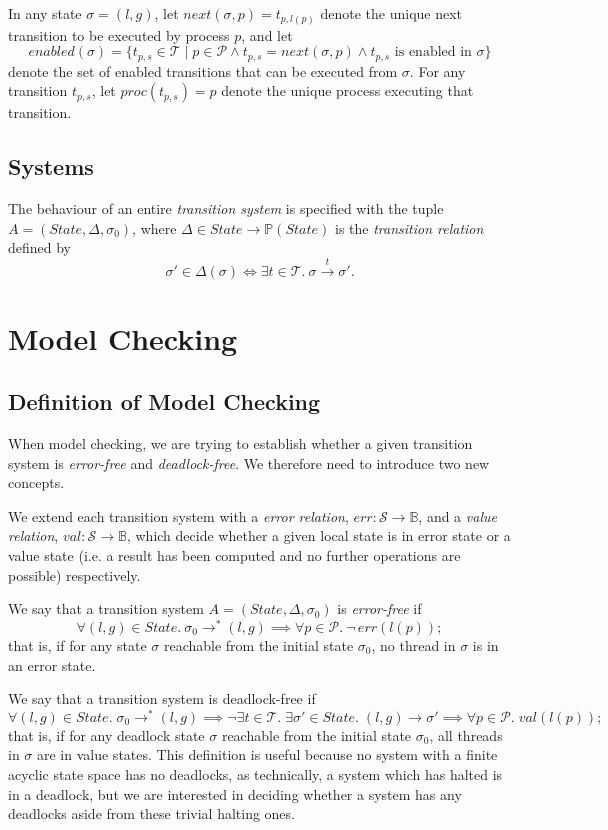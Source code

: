 \documentclass[12pt,a4paper,twoside,openright]{report}
\begin{document}
In any state $\sigma = (l, g)$, let
$\textit{next}(\sigma, p) = t_{p,l(p)}$ denote the unique next transition
to be executed by process $p$, and let
\[
	\textit{enabled}(\sigma) = \{t_{p,s} \in \mathcal{T} \mid
	p \in \mathcal{P} \wedge t_{p,s} = \textit{next}(\sigma, p)
	\wedge t_{p,s} \text{ is enabled in } \sigma\}
\]
denote the set of enabled transitions that can be executed from $\sigma$.
For any transition $t_{p,s}$, let $\textit{proc}(t_{p,s}) = p$
denote the unique process executing that transition.

\subsection{Systems}
The behaviour of an entire \emph{transition system} is
specified with the tuple $A = (\textit{State}, \Delta, \sigma_0)$,
where $\Delta \in State \to \mathbb{P}(State)$
is the \emph{transition relation} defined by
\[
	\sigma' \in \Delta(\sigma) \iff
	\exists t \in \mathcal{T}. \ \sigma \xrightarrow{t} \sigma'.
\]

\section{Model Checking}

\subsection{Definition of Model Checking}
When model checking, we are trying to establish whether a
given transition system is \emph{error-free} and
\emph{deadlock-free}. We therefore need to introduce two
new concepts.

We extend each transition system with a \emph{error relation},
$\textit{err} : \mathcal{S} \to \mathbb{B}$, and a \emph{value relation},
$\textit{val} : \mathcal{S} \to \mathbb{B}$, which decide whether a given
local state is in error state or a value state (i.e. a result has
been computed and no further operations are possible) respectively.

We say that a transition system $A = (\textit{State}, \Delta, \sigma_0)$ is
\emph{error-free} if
\[
	\forall (l, g) \in \textit{State}. \ \sigma_0 \longrightarrow^* (l, g)
	\implies \forall p \in \mathcal{P}.\ \neg\,\textit{err}(l(p));
\]
that is, if for any state $\sigma$ reachable from the initial state
$\sigma_0$, no thread in $\sigma$ is in an error state.

We say that a transition system is deadlock-free if
\[
	\forall (l, g) \in \textit{State}. \;\sigma_0 \longrightarrow^* (l, g)
	\implies \neg \exists t \in \mathcal{T}.\;
		\exists\sigma' \in \textit{State}.\;(l, g) \longrightarrow \sigma'
	\implies \forall p \in \mathcal{P}.\;\textit{val}(l(p));
\]
that is, if for any deadlock state $\sigma$ reachable from
the initial state $\sigma_0$, all threads in $\sigma$ are
in value states. This definition is useful because no
system with a finite acyclic state space has no deadlocks,
as technically, a system which has halted is in a deadlock,
but we are interested in deciding whether a system has any
deadlocks aside from these trivial halting ones.
\end{document}
